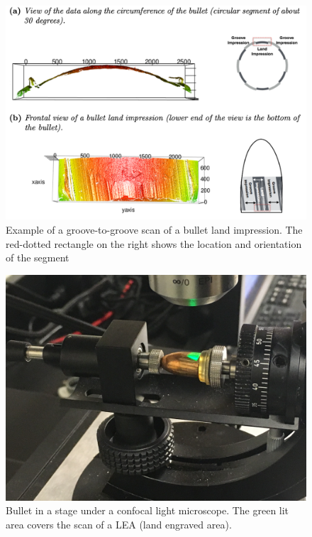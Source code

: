 \documentclass[12pt]{article}\usepackage[]{graphicx}\usepackage[]{color}
\newenvironment{knitrout}{}{} %
\theoremstyle{nonumberplain}
\begin{document}
\begin{knitrout}
\color{fgcolor}\begin{figure}[H]

{\centering \includegraphics[width=0.5\linewidth]{../images/hare-bullet-anatomy-image} 

}

\caption[Example of a groove-to-groove scan of a bullet land impression]{Example of a groove-to-groove scan of a bullet land impression. The red-dotted rectangle on the right shows the location and orientation of the segment}\label{fig:hare-bullet-anatomy-image}
\end{figure}


\end{knitrout}


\begin{knitrout}
\color{fgcolor}\begin{figure}[H]

{\centering \includegraphics[width=0.5\linewidth]{../images/microscope-bullet} 

}

\caption[Bullet in a stage under a confocal light microscope]{Bullet in a stage under a confocal light microscope. The green lit area covers the scan of a LEA (land engraved area).}\label{fig:microscope-bullet}
\end{figure}


\end{knitrout}
\end{document}
